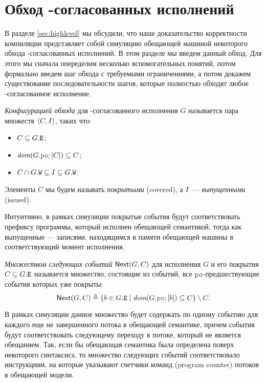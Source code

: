 \section{Обход \ARM-согласованных исполнений}
\label{sec:traversal}

В разделе \ref{sec:highlevel} мы обсудили, что наше доказательство корректности компиляции представляет
собой симуляцию обещающей машиной некоторого обхода \ARM-согласованных исполнений. В этом разделе
мы введем данный обход. Для этого мы сначала опеределим несколько вспомогательных понятий,
потом формально введем шаг обхода с требуемыми ограничениями, а потом докажем существование
последовательности шагов, которые полностью обходят любое \ARM-согласованное исполнение.

\begin{definition}
\emph{Конфигурацией обхода} для \ARM-согласованного исполнения $G$ называется пара множеств ${\langle{C, I}\rangle}$, таких что:
\begin{itemize}
  \item $C \subseteq G.{\mathtt{E}}$;
  \item $\dom{G.\lPO;[C]}\suq C$;
  \item $C \cap G.{\mathtt{W}} \subseteq I \subseteq G.{\mathtt{W}}$.
\end{itemize}
Элементы $C$ мы будем называть \emph{покрытыми} (covered), а $I$ --- \emph{выпущенными} (issued).
\end{definition}
Интуитивно, в рамках симуляции покрытые события будут соответствовать префиксу программы,
который исполнен обещающей семантикой, тогда как выпущенные --- записями, находящимся в памяти обещающей машины
в соответствующий момент исполнения.
\begin{definition}
  \emph{Множеством следующих событий} ${\sf Next}(G, C)$ для исполнения $G$ и его покрытия $C \subseteq G.{\mathtt{E}}$
  называется множество, состоящие из событий, все $\lPO$-предшествующие события которых уже покрыты:
  \[\nextset(G, C) \defeq \{b \in G.\lE \mid \dom{G.\lPO;[b]} \suq C\} \setminus C.\]
\end{definition}
В рамках симуляции данное множество будет содержать по одному событию для каждого еще не завершенного потока
в обещающей семантике, причем события будут соответствовать следующему переходу в потоке, который не является обещанием.
Так, если бы обещающая семантика была определена поверх некоторого синтаксиса, то множество
следующих событий соответствовало инструкциям, на которые указывают счетчики команд (program counter) потоков
в обещающей модели.

